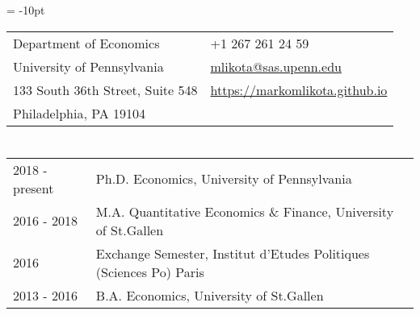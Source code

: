 \documentclass[letter,10pt]{article}
\newcommand{\rowspace}{2pt} %
\newcommand{\myEmph}[1]{#1}
\begin{document}
		\pagestyle{fancy}
		\footskip = -10pt

		\renewcommand{\headrulewidth}{0pt}
		\renewcommand{\footrulewidth}{0pt}

		\vspace*{-40pt}
		\noindent \centerline{ \textbf{\Large{}}}
		\vspace*{-0pt}

	\begin{table}[h!]
		\begin{tabular}{p{8.75cm}p{8.75cm}}
		Department of Economics						& +1 267 261 24 59 \\
		University of Pennsylvania				& \href{mlikota@sas.upenn.edu}{mlikota@sas.upenn.edu} \\
		133 South 36th Street, Suite 548 	& \href{https://markomlikota.github.io}{https://markomlikota.github.io}\\
		Philadelphia, PA 19104 						&  \\
		\end{tabular}
	\end{table}




\section*{}

\begin{table}[h!]
	\begin{tabular}{p{2.5cm}p{15cm}}
		2018 - present	& \myEmph{Ph.D. Economics,} University of Pennsylvania \\[\rowspace]
		2016 - 2018 		& \myEmph{M.A. Quantitative Economics \& Finance,} University of St.Gallen \\[\rowspace]
		2016  					& \myEmph{Exchange Semester,} Institut d'Etudes Politiques (Sciences Po) Paris \\[\rowspace]
		2013 - 2016 		& \myEmph{B.A. Economics,} University of St.Gallen \\
	\end{tabular}
\end{table}



\section*{}
\end{document}
